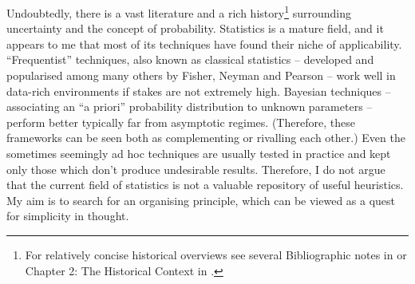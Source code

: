 \documentclass{article}
\begin{document}
Undoubtedly, there is a vast literature and a rich history\footnote{For relatively concise historical overviews see several Bibliographic notes in \cite{book:CoxStatistics} or Chapter 2: The Historical Context in \cite{book:ProbabilityAndFinanceGame}.} surrounding uncertainty and the concept of probability.
Statistics is a mature field, and it appears to me that most of its techniques have found their niche of applicability.
``Frequentist'' techniques, also known as classical statistics -- developed and popularised among many others by Fisher, Neyman and Pearson -- work well in data-rich environments if stakes are not extremely high. Bayesian techniques -- associating an ``a priori'' probability distribution to unknown parameters -- perform better typically far from asymptotic regimes. (Therefore, these frameworks can be seen both as complementing or rivalling each other.) Even the sometimes seemingly ad hoc techniques are usually tested in practice and kept only those which don't produce undesirable results. Therefore, I do not argue that the current field of statistics is not a valuable repository of useful heuristics. My aim is to search for an organising principle, which can be viewed as a quest for simplicity in thought.
\end{document}

